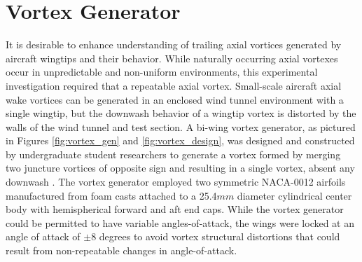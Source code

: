 \section{Vortex Generator}

It is desirable to enhance understanding of 
trailing axial vortices generated by aircraft wingtips and their behavior.
While naturally occurring axial vortexes occur in unpredictable and non-uniform 
environments, this experimental investigation required that a repeatable axial 
vortex.  
Small-scale aircraft axial wake vortices can be generated in an enclosed wind 
tunnel environment with a single wingtip, but the downwash behavior of a 
wingtip vortex is distorted by the walls of the wind tunnel and test section. A 
bi-wing vortex generator, as pictured in Figures 
\ref{fig:vortex_gen} and \ref{fig:vortex_design}, was designed and constructed 
by undergraduate student researchers to generate a vortex formed by merging two 
juncture vortices of opposite sign and resulting in a single vortex, absent any 
downwash \cite{davis2012}. The vortex generator employed two symmetric NACA-0012
airfoils manufactured from foam casts attached to a 25.4$mm$ diameter 
cylindrical center body with hemispherical forward and aft end caps. 
While the vortex generator could be permitted to have variable
angles-of-attack, the wings were locked at an angle of attack of $\pm$8 degrees 
to avoid vortex structural distortions that could result from non-repeatable 
changes in angle-of-attack.

